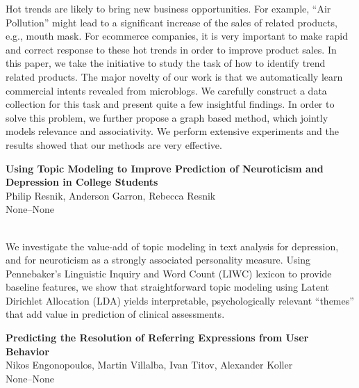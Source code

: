 \documentclass[twoside,makeidx]{book}
\begin{document}
\nopagebreak%
\noindent%
{\small Hot trends are likely to bring new business opportunities. For example, ``Air Pollution'' might lead to a significant increase of the sales of related products, e.g., mouth mask. For ecommerce companies, it is very important to make rapid and correct response to these hot trends in order to improve product sales. In this paper, we take the initiative to study the task of how to identify trend related products. The major novelty of our work is that we automatically learn commercial intents revealed from microblogs. We carefully construct a data collection for this task and present quite a few insightful findings. In order to solve this problem, we further propose a graph based method, which jointly models relevance and associativity. We perform extensive experiments and the results showed that our methods are very effective.}
\par\vspace{2em}\noindent%
\begin{minipage}{\linewidth}%
\begin{center}
\textbf{\normalsize Using Topic Modeling to Improve Prediction of Neuroticism and Depression in College Students}\\
\normalsize  Philip Resnik,  Anderson Garron,  Rebecca Resnik\\
{\small None--None}\\
\end{center}
\end{minipage}\\[0.5em]
\nopagebreak%
\noindent%
{\small We investigate the value-add of topic modeling in text analysis for depression, and for neuroticism as a strongly associated personality measure.  Using Pennebaker's Linguistic Inquiry and Word Count (LIWC) lexicon to provide baseline features, we show that straightforward topic modeling using Latent Dirichlet Allocation (LDA) yields interpretable, psychologically relevant  ``themes'' that add value in prediction of clinical assessments.}
\par\vspace{2em}\noindent%
\begin{minipage}{\linewidth}%
\begin{center}
\textbf{\normalsize Predicting the Resolution of Referring Expressions from User Behavior}\\
\normalsize  Nikos Engonopoulos,  Martin Villalba,  Ivan Titov,  Alexander Koller\\
{\small None--None}\\
\end{center}
\end{minipage}\\[0.5em]
\end{document}
